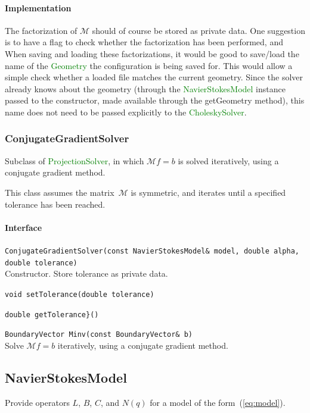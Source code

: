 \documentclass[11pt]{article}
\def\class#1{\textcolor{green}{\ttfamily\small #1}} %
\def\fn#1{{\ttfamily\small #1}} %
\let\code\lstinline
\begin{document}
\paragraph{Implementation}
The factorization of $\mathcal{M}$ should of course be stored as private data.  One suggestion is to have a flag to check whether the factorization has been performed, and When saving and loading these factorizations, it would be good to save/load the name of the \class{Geometry} the configuration is being saved for.  This would allow a simple check whether a loaded file matches the current geometry.  Since the solver already knows about the geometry (through the \class{NavierStokesModel} instance passed to the constructor, made available through the \fn{getGeometry} method), this name does not need to be passed explicitly to the \class{CholeskySolver}.

\subsubsection{ConjugateGradientSolver}
Subclass of \class{ProjectionSolver}, in which $\mathcal{M}f=b$ is solved iteratively, using a conjugate gradient method.

This class assumes the matrix~$\mathcal{M}$ is symmetric, and iterates until a specified tolerance has been reached.

\paragraph{Interface}
\begin{description}
	\item \code|ConjugateGradientSolver(const NavierStokesModel& model, double alpha, double tolerance)|\\
		Constructor.  Store tolerance as private data.
	\item \code|void setTolerance(double tolerance)|
	\item \code|double getTolerance}()|
	\item \code|BoundaryVector Minv(const BoundaryVector& b)|\\
		Solve $\mathcal{M}f = b$ iteratively, using a conjugate gradient method.
\end{description}


\subsection{NavierStokesModel}
Provide operators $L$, $B$, $C$, and $N(q)$ for a model of the form~(\ref{eq:model}).
\end{document}

